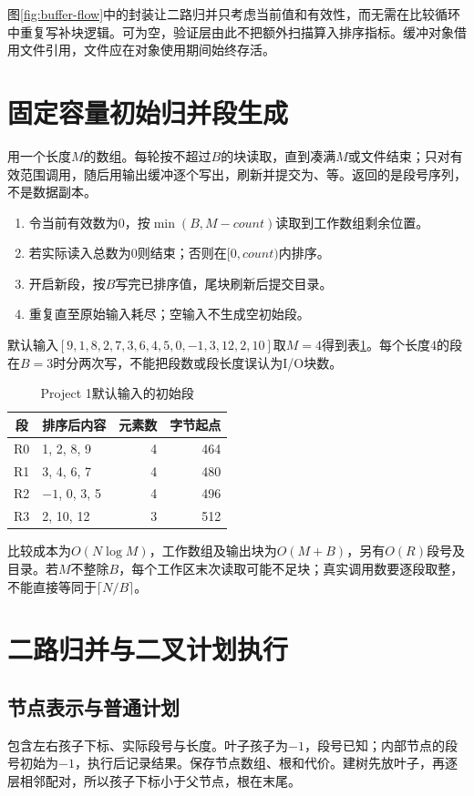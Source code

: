 图\ref{fig:buffer-flow}中的封装让二路归并只考虑当前值和有效性，而无需在比较循环中重复写补块逻辑。可为空，验证层由此不把额外扫描算入排序指标。缓冲对象借用文件引用，文件应在对象使用期间始终存活。

\section{固定容量初始归并段生成}
用一个长度$M$的数组。每轮按不超过$B$的块读取，直到凑满$M$或文件结束；只对有效范围调用，随后用输出缓冲逐个写出，刷新并提交为、等。返回的是段号序列，不是数据副本。

\begin{enumerate}
\item 令当前有效数为0，按$\min(B,M-count)$读取到工作数组剩余位置。
\item 若实际读入总数为0则结束；否则在$[0,count)$内排序。
\item 开启新段，按$B$写完已排序值，尾块刷新后提交目录。
\item 重复直至原始输入耗尽；空输入不生成空初始段。
\end{enumerate}

默认输入$[9,1,8,2,7,3,6,4,5,0,-1,3,12,2,10]$取$M=4$得到表\ref{tab:initial}。每个长度4的段在$B=3$时分两次写，不能把段数或段长度误认为I/O块数。

\begin{table}[htbp]\centering\caption{Project 1默认输入的初始段}\label{tab:initial}
\begin{tabular}{clrr}\toprule 段 & 排序后内容 & 元素数 & 字节起点\\\midrule
R0 & 1, 2, 8, 9 & 4 & 464\\
R1 & 3, 4, 6, 7 & 4 & 480\\
R2 & $-1$, 0, 3, 5 & 4 & 496\\
R3 & 2, 10, 12 & 3 & 512\\\bottomrule
\end{tabular}\end{table}

比较成本为$O(N\log M)$，工作数组及输出块为$O(M+B)$，另有$O(R)$段号及目录。若$M$不整除$B$，每个工作区末次读取可能不足块；真实调用数要逐段取整，不能直接等同于$\lceil N/B\rceil$。

\section{二路归并与二叉计划执行}
\subsection{节点表示与普通计划}
包含左右孩子下标、实际段号与长度。叶子孩子为$-1$，段号已知；内部节点的段号初始为$-1$，执行后记录结果。保存节点数组、根和代价。建树先放叶子，再逐层相邻配对，所以孩子下标小于父节点，根在末尾。

